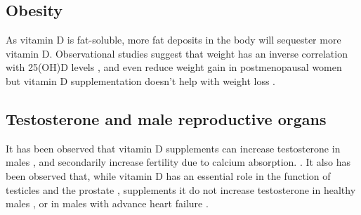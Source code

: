 \subsection{Obesity}

As vitamin D is fat-soluble, more fat deposits in the body will sequester more vitamin D. Observational studies suggest that weight has an inverse correlation with 25(OH)D levels \cite{ref:Ekwaru2014, ref:Drincic2013, ref:Earthman2011, ref:Mallard2016}, and even reduce weight gain in postmenopausal women \cite{ref:Caan2007} but vitamin D supplementation doesn't help with weight loss \cite{ref:Pathak2014}.

\subsection{Testosterone and male reproductive organs}

It has been observed that vitamin D supplements can increase testosterone in males \cite{Pilz2010}, and secondarily increase fertility due to calcium absorption. \cite{ref:1_Institute_of_Medicine2011-zg, ref:2_Limongi2017-al, ref:3_680f7627099e40be878db46152ebe484}. It also has been observed that, while vitamin D has an essential role in the function of testicles and the prostate \cite{Santos2020},  supplements it do not increase testosterone in healthy males \cite{Lerchbaum2017, Santos2020}, or in males with advance heart failure \cite{Zittermann2018}.


